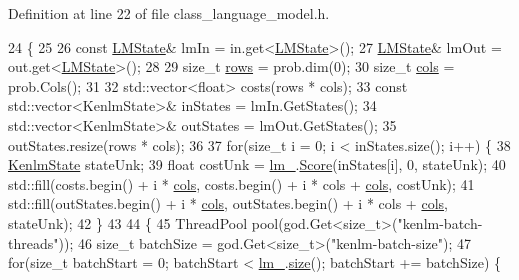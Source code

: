 Definition at line 22 of file class\+\_\+language\+\_\+model.\+h.


\begin{DoxyCode}
24                                    \{
25       
26       \textcolor{keyword}{const} \hyperlink{classamunmt_1_1GPU_1_1ClassLanguageModel_ae3570f0dd0a320300e83f2d282865640}{LMState}& lmIn = in.get<\hyperlink{classamunmt_1_1GPU_1_1ClassLanguageModel_ae3570f0dd0a320300e83f2d282865640}{LMState}>();
27       \hyperlink{classamunmt_1_1GPU_1_1ClassLanguageModel_ae3570f0dd0a320300e83f2d282865640}{LMState}& lmOut = out.get<\hyperlink{classamunmt_1_1GPU_1_1ClassLanguageModel_ae3570f0dd0a320300e83f2d282865640}{LMState}>();
28       
29       \textcolor{keywordtype}{size\_t} \hyperlink{namespacemarian_ace1e9a63d52edc363d70d661cf8d0257}{rows} = prob.dim(0);
30       \textcolor{keywordtype}{size\_t} \hyperlink{namespacemarian_ab9fbdcc76cc853270094524572584222}{cols} = prob.Cols();
31       
32       std::vector<float> costs(rows * cols);
33       \textcolor{keyword}{const} std::vector<KenlmState>& inStates = lmIn.GetStates();
34       std::vector<KenlmState>& outStates = lmOut.GetStates();
35       outStates.resize(rows * cols);
36     
37       \textcolor{keywordflow}{for}(\textcolor{keywordtype}{size\_t} i = 0; i < inStates.size(); i++) \{
38           \hyperlink{kenlm_8h_ac0671733f284e84250e464637645ade4}{KenlmState} stateUnk;
39           \textcolor{keywordtype}{float} costUnk = \hyperlink{classLanguageModel_a16259871203adfacf8617ecd5e29f6de}{lm\_}.\hyperlink{classLM_aefaa618805be0cdcfe1a358f5d6ed486}{Score}(inStates[i], 0, stateUnk);
40           std::fill(costs.begin() + i * \hyperlink{namespacemarian_ab9fbdcc76cc853270094524572584222}{cols}, costs.begin() + i * cols + 
      \hyperlink{namespacemarian_ab9fbdcc76cc853270094524572584222}{cols}, costUnk);
41           std::fill(outStates.begin() + i * \hyperlink{namespacemarian_ab9fbdcc76cc853270094524572584222}{cols}, outStates.begin() + i * cols + 
      \hyperlink{namespacemarian_ab9fbdcc76cc853270094524572584222}{cols}, stateUnk);
42       \}
43       
44       \{  
45         ThreadPool pool(god.Get<\textcolor{keywordtype}{size\_t}>(\textcolor{stringliteral}{"kenlm-batch-threads"}));
46         \textcolor{keywordtype}{size\_t} batchSize = god.Get<\textcolor{keywordtype}{size\_t}>(\textcolor{stringliteral}{"kenlm-batch-size"});
47         \textcolor{keywordflow}{for}(\textcolor{keywordtype}{size\_t} batchStart = 0; batchStart < \hyperlink{classLanguageModel_a16259871203adfacf8617ecd5e29f6de}{lm\_}.\hyperlink{classLM_adee9e7617ec788bcf48ca57555aac428}{size}(); batchStart += batchSize) \{

\end{DoxyCode}
